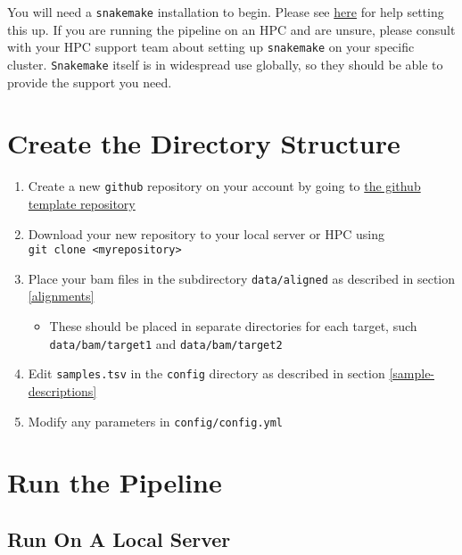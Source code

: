\documentclass[
]{book}
\providecommand{\tightlist}{%
  \setlength{\itemsep}{0pt}\setlength{\parskip}{0pt}}
\begin{document}
You will need a \texttt{snakemake} installation to begin.
Please see \href{https://snakemake.readthedocs.io/en/stable/getting_started/installation.html}{here} for help setting this up.
If you are running the pipeline on an HPC and are unsure, please consult with your HPC support team about setting up \texttt{snakemake} on your specific cluster.
\texttt{Snakemake} itself is in widespread use globally, so they should be able to provide the support you need.

\hypertarget{quick-directories}{%
\section{Create the Directory Structure}\label{quick-directories}}

\begin{enumerate}
\def\labelenumi{\arabic{enumi}.}
\tightlist
\item
  Create a new \texttt{github} repository on your account by going to \href{https://github.com/steveped/GRAVI/generate}{the github template repository}
\item
  Download your new repository to your local server or HPC using \texttt{git\ clone\ \textless{}myrepository\textgreater{}}
\item
  Place your bam files in the subdirectory \texttt{data/aligned} as described in section \ref{alignments}

  \begin{itemize}
  \tightlist
  \item
    These should be placed in separate directories for each target, such \texttt{data/bam/target1} and \texttt{data/bam/target2}
  \end{itemize}
\item
  Edit \texttt{samples.tsv} in the \texttt{config} directory as described in section \ref{sample-descriptions}
\item
  Modify any parameters in \texttt{config/config.yml}
\end{enumerate}

\hypertarget{quick-run}{%
\section{Run the Pipeline}\label{quick-run}}

\hypertarget{run-on-a-local-server}{%
\subsection{Run On A Local Server}\label{run-on-a-local-server}}
\end{document}

